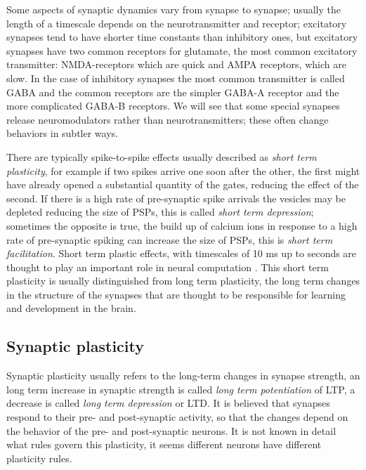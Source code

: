 \documentclass{article}
\begin{document}
Some aspects of synaptic dynamics vary from synapse to synapse;
usually the length of a timescale depends on the neurotransmitter and
receptor; excitatory synapses tend to have shorter time constants than
inhibitory ones, but excitatory synapses have two common receptors for
glutamate, the most common excitatory transmitter: NMDA-receptors
which are quick and AMPA receptors, which are slow. In the case of
inhibitory synapses the most common transmitter is called GABA and the
common receptors are the simpler GABA-A receptor and the more
complicated GABA-B receptors. We will see that some special synapses
release neuromodulators rather than neurotransmitters; these often
change behaviors in subtler ways.

There are typically spike-to-spike effects usually described as
\textsl{short term plasticity}, for example if two spikes arrive one
soon after the other, the first might have already opened a
substantial quantity of the gates, reducing the effect of the second.
If there is a high rate of pre-synaptic spike arrivals the vesicles
may be depleted reducing the size of PSPs, this is called
\textsl{short term depression}; sometimes the opposite is true, the
build up of calcium ions in response to a high rate of pre-synaptic
spiking can increase the size of PSPs, this is \textsl{short term
  facilitation}. Short term plastic effects, with timescales of 10 ms
up to seconds are thought to play an important role in neural
computation \cite{AbbottEtAl1997a}. This short term plasticity is
usually distinguished from long term plasticity, the long term changes
in the structure of the synapses that are thought to be responsible
for learning and development in the brain.

\subsection*{Synaptic plasticity}

Synaptic plasticity usually refers to the long-term changes in synapse
strength, an long term increase in synaptic strength is called
\textsl{long term potentiation} of LTP, a decrease is called
\textsl{long term depression} or LTD. It is believed that synapses
respond to their pre- and post-synaptic activity, so that the changes
depend on the behavior of the pre- and post-synaptic neurons. It is
not known in detail what rules govern this plasticity, it seems
different neurons have different plasticity rules. 
\end{document}
